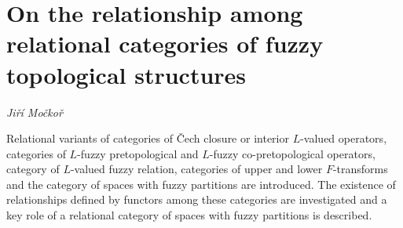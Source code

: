 \documentclass[../booklet.tex]{subfiles}
\begin{document}
\section[On the relationship among relational categories of fuzzy topological structures. {\it Jiří Močkoř}]{On the relationship among relational categories of fuzzy topological structures}

\begin{center}
  {\it Jiří Močkoř}
\end{center}

\vskip 0.8cm


	Relational variants of categories of \v Cech closure or interior $L$-valued operators, categories of $L$-fuzzy pretopological and $L$-fuzzy co-pretopological operators, category of $L$-valued fuzzy relation, categories of upper and lower $F$-transforms and the category of spaces with fuzzy partitions are introduced. The existence of relationships defined by functors among these categories are investigated and a key role of a relational category of spaces with fuzzy partitions is described.
\end{document}
